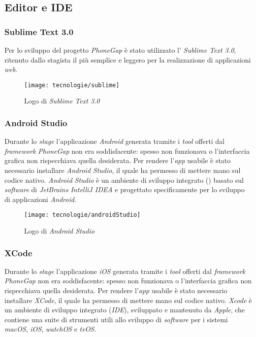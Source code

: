 \subsection{Editor e IDE}

\subsubsection{Sublime Text 3.0}

Per lo sviluppo del progetto \textit{PhoneGap} è stato utilizzato l' \textit{Sublime Text 3.0}, ritenuto dallo stagista il più semplice e leggero per la realizzazione di applicazioni \textit{web}. 

\begin{figure}[!h] 
    \centering 
    \texttt{[image: tecnologie/sublime]} 
    \caption{Logo di \textit{Sublime Text 3.0}}
\end{figure}

\subsubsection{Android Studio}

Durante lo \textit{stage} l'applicazione \textit{Android} generata tramite i \textit{tool} offerti dal \textit{framework PhoneGap} non era soddisfacente: spesso non funzionava o l'interfaccia grafica non rispecchiava quella desiderata. Per rendere l'\textit{app} usabile è stato necessario installare \textit{Android Studio}, il quale ha permesso di mettere mano sul codice nativo. \textit{Android Studio} è un ambiente di sviluppo integrato () basato sul \textit{software} di \textit{JetBrains IntelliJ IDEA} e progettato specificamente per lo sviluppo di applicazioni \textit{Android}.

\begin{figure}[!h] 
    \centering 
    \texttt{[image: tecnologie/androidStudio]} 
    \caption{Logo di \textit{Android Studio}}
\end{figure}

\subsubsection{XCode}

Durante lo \textit{stage} l'applicazione \textit{iOS} generata tramite i \textit{tool} offerti dal \textit{framework PhoneGap} non era soddisfacente: spesso non funzionava o l'interfaccia grafica non rispecchiava quella desiderata. Per rendere l'\textit{app} usabile è stato necessario installare \textit{XCode}, il quale ha permesso di mettere mano sul codice nativo. \textit{Xcode} è un ambiente di sviluppo integrato (\textit{IDE}), sviluppato e mantenuto da \textit{Apple}, che contiene una suite di strumenti utili allo sviluppo di \textit{software} per i sistemi \textit{macOS}, \textit{iOS}, \textit{watchOS} e \textit{tvOS}.

